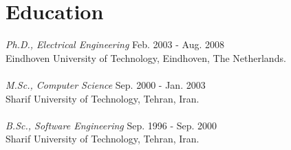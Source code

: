 \section{Education} 

{\sl Ph.D., Electrical Engineering} \hfill Feb. 2003 - Aug. 2008 \\
Eindhoven University of Technology, Eindhoven, The Netherlands. \\ \\
{\sl M.Sc., Computer Science} \hfill Sep. 2000 - Jan. 2003  \\
Sharif University of Technology, Tehran, Iran.\\  \\
{\sl B.Sc., Software Engineering} \hfill Sep. 1996 - Sep. 2000  \\
Sharif University of Technology, Tehran, Iran.

